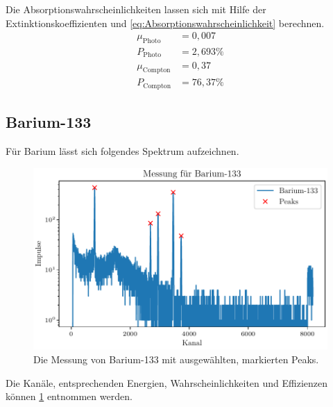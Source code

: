 Die Absorptionswahrscheinlichkeiten lassen sich mit Hilfe der Extinktionskoeffizienten %
und \eqref{eq:Absorptionswahrscheinlichkeit} berechnen.
\begin{align}
    \mu_\text{Photo} &= 0,007 \\
    P_\text{Photo} &= 2,693 \% \\
    \mu_\text{Compton} &= 0,37 \\
    P_\text{Compton} &= 76,37 \%
\end{align}


\subsection{Barium-133}

Für Barium lässt sich folgendes Spektrum aufzeichnen.

\begin{figure}[H]
    \centering
    \includegraphics[width=\textwidth]{plots/Barium.pdf}
    \caption{Die Messung von Barium-133 mit ausgewählten, markierten Peaks.}
    \label{fig:barium}
\end{figure}

Die Kanäle, entsprechenden Energien, Wahrscheinlichkeiten und Effizienzen können \ref{fig:barium} entnommen werden.

